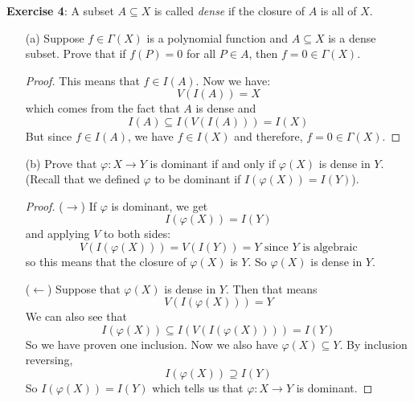 \documentclass{article}
\begin{document}
\textbf{Exercise 4}: A subset $A \subseteq X$ is called \textit{dense} if the closure of $A$ is all of $X$.
    \begin{itemize}
        \item [(a)] Suppose $f \in \Gamma(X)$ is a polynomial function and $A \subseteq X$ is a dense subset. Prove that if $f(P) = 0$ for all $P \in A$, then $f = 0 \in \Gamma(X)$.
            \begin{proof}
                This means that $f \in I(A)$. Now we have:
                    \begin{equation*}
                        V(I(A)) = X
                    \end{equation*}
                which comes from the fact that $A$ is dense and
                    \begin{equation*}
                        I(A) \subseteq I(V(I(A))) = I(X)
                    \end{equation*}
                But since $f \in I(A)$, we have $f\in I(X)$ and therefore, $f = 0 \in \Gamma(X)$.
            \end{proof}

        \item [(b)] Prove that $\varphi : X \rightarrow Y$ is dominant if and only if $\varphi(X)$ is dense in $Y$. (Recall that we defined $\varphi$ to be dominant if $I(\varphi(X)) = I(Y)$).
            \begin{proof}
                ($\rightarrow $) If $\varphi$ is dominant, we get
                    \begin{equation*}
                        I(\varphi(X)) = I(Y)
                    \end{equation*}
                and applying $V$ to both sides:
                    \begin{equation*}
                        V(I(\varphi(X))) = V(I(Y)) = Y \text{ since $Y$ is algebraic}
                    \end{equation*}
                so this means that the closure of $\varphi(X)$ is $Y$. So $\varphi(X)$ is dense in $Y$.

                ($\leftarrow $) Suppose that $\varphi(X)$ is dense in $Y$. Then that means
                    \begin{equation*}
                        V(I(\varphi(X))) = Y
                    \end{equation*}
                We can also see that 
                    \begin{equation*}
                        I(\varphi(X)) \subseteq I(V(I(\varphi(X)))) = I(Y)
                    \end{equation*}
                So we have proven one inclusion. Now we also have $\varphi(X) \subseteq Y$. By inclusion reversing, 
                    \begin{equation*}
                        I(\varphi(X)) \supseteq I(Y)
                    \end{equation*}
                So $I(\varphi(X)) = I(Y)$ which tells us that $\varphi : X \rightarrow Y$ is dominant.
            \end{proof}


\end{itemize}
\end{document}
